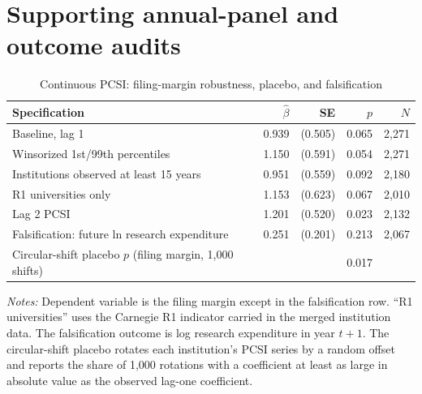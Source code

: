 \section{Supporting annual-panel and outcome audits}\label{app:annual}

\begin{table}[htbp]\centering
\caption{Continuous PCSI: filing-margin robustness, placebo, and falsification}\label{tab:twferobust}
\begin{threeparttable}\footnotesize
\begin{tabular}{lrrrr}\toprule
Specification & $\hat\beta$ & SE & $p$ & $N$ \\\midrule
Baseline, lag 1 & 0.939 & (0.505) & 0.065 & 2,271 \\
Winsorized 1st/99th percentiles & 1.150 & (0.591) & 0.054 & 2,271 \\
Institutions observed at least 15 years & 0.951 & (0.559) & 0.092 & 2,180 \\
R1 universities only & 1.153 & (0.623) & 0.067 & 2,010 \\
Lag 2 PCSI & 1.201 & (0.520) & 0.023 & 2,132 \\
Falsification: future ln research expenditure & 0.251 & (0.201) & 0.213 & 2,067 \\
Circular-shift placebo $p$ (filing margin, 1,000 shifts) &  &  & 0.017 &  \\
\bottomrule
\end{tabular}
\begin{tablenotes}[flushleft]\footnotesize
\item \textit{Notes:} Dependent variable is the filing margin except in the falsification row. ``R1 universities'' uses the Carnegie R1 indicator carried in the merged institution data. The falsification outcome is log research expenditure in year $t+1$. The circular-shift placebo rotates each institution's PCSI series by a random offset and reports the share of 1,000 rotations with a coefficient at least as large in absolute value as the observed lag-one coefficient.
\end{tablenotes}
\end{threeparttable}
\end{table}

